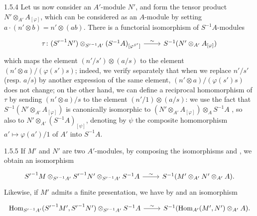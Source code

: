 \documentclass[../main.tex]{subfiles}
\begin{document}
\begin{env}{1.5.4}
Let us now consider an $A'$-module $N'$, and form the tensor product $N'\otimes_{A'}A_{[\varphi]}$,
which can be considered as an $A$-module by setting $a\cdot(n'\otimes b)=n'\otimes(ab)$. There is a
functorial isomorphism of $S^{-1}A$-modules
\[
  \begin{tikzcd}
    \tau\colon({S'}^{-1}N')\otimes_{{S'}^{-1}A'}(S^{-1}A)_{[\varphi^{S'}]}\ar[r,"\sim"] &
    S^{-1}(N'\otimes_{A'}A_{[\varphi]})
  \end{tikzcd}
\]
which maps the element $(n'/s')\otimes(a/s)$ to the element $(n'\otimes a)/(\varphi(s')s)$;
indeed, we verify separately that when we replace $n'/s'$ (resp. $a/s$) by another expression of the
same element, $(n'\otimes a)/(\varphi(s')s)$ does not change; on the other hand, we can define a
reciprocal homomorphism of $\tau$ by sending $(n'\otimes a)/s$ to the element $(n'/1)\otimes(a/s)$:
we use the fact that $S^{-1}(N'\otimes_{A'}A_{[\varphi]})$ is canonically isomorphic to
$(N'\otimes_{A'}A_{[\varphi]})\otimes_A S^{-1}A$ , so also to $N'\otimes_{A'}(S^{-1}A)_{[\psi]}$,
denoting by $\psi$ the composite homomorphism $a'\mapsto\varphi(a')/1$ of $A'$ into $S^{-1}A$.
\end{env}

\begin{env}{1.5.5}
If $M'$ and $N'$ are two $A'$-modules, by composing the isomorphisms  and , we obtain
an isomorphism
\[
  \begin{tikzcd}
    {S'}^{-1}M\otimes_{{S'}^{-1}A'}{S'}^{-1}N'\otimes_{{S'}^{-1}A'}S^{-1}A\ar[r,"\sim"] &
    S^{-1}(M'\otimes_{A'}N'\otimes_{A'}A).
  \end{tikzcd}
\]
Likewise, if $M'$ admits a finite presentation, we have by  and  an isomorphism
\[
  \begin{tikzcd}
    \Hom_{{S'}^{-1}A'}({S'}^{-1}M',{S'}^{-1}N')\otimes_{{S'}^{-1}A'}S^{-1}A\ar[r,"\sim"] &
    S^{-1}(\Hom_{A'}(M',N')\otimes_{A'}A).
  \end{tikzcd}
\]
\end{env}
\end{document}
